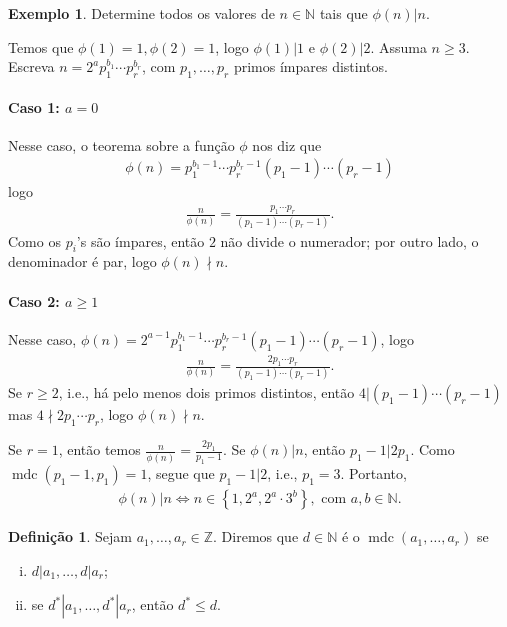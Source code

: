 \documentclass[a4paper,11pt,twoside, leqno]{article}
\DeclareMathOperator{\mdc}{mdc}
\theoremstyle{definition}
\newtheorem*{definition}{Definição}
\newtheorem*{example}{Exemplo}
\begin{document}
\begin{example}
	Determine todos os valores de $n\in\mathbb{N}$ tais que $\phi(n)|n$. 
	\par\vspace{0.3cm} Temos que $\phi(1) = 1, \phi(2) = 1$, logo $\phi(1)|1$ e $\phi(2)|2$. Assuma $n\geq 3$. Escreva $n = 2^ap_1^{b_1}\cdots p_r^{b_r}$, com $p_1, \dots ,p_r$ primos ímpares distintos.
	\paragraph{Caso 1: $a = 0$} Nesse caso, o teorema sobre a função $\phi$ nos diz que 
	\begin{align*}
	\phi(n) = p_1^{b_1 - 1}\cdots p_r^{b_r - 1}(p_1 - 1)\cdots (p_r - 1)
	\end{align*}
	logo
	\begin{align*}
	\frac{n}{\phi(n)} = \frac{p_1\cdots p_r}{(p_1 - 1)\cdots (p_r - 1)}.
	\end{align*}
	Como os $p_i$'s são ímpares, então $2$ não divide o numerador; por outro lado, o denominador é par, logo $\phi(n)\nmid n$.
	\paragraph{Caso 2: $a\geq 1$} Nesse caso, $\phi(n) = 2^{a-1}p_1^{b_1 - 1}\cdots p_r^{b_r - 1}(p_1 - 1)\cdots (p_r - 1)$, logo 
	\begin{align*}
	\frac{n}{\phi(n)} = \frac{2p_1\cdots p_r}{(p_1 - 1)\cdots (p_r - 1)}.
	\end{align*}
	Se $r\geq 2$, i.e., há pelo menos dois primos distintos, então $4|(p_1 - 1)\cdots (p_r - 1)$ mas $4\nmid 2p_1\cdots p_r$, logo $\phi(n)\nmid n$.
	\par\vspace{0.3cm} Se $r=1$, então temos $\displaystyle{\frac{n}{\phi(n)} = \frac{2p_1}{p_1 - 1}}$. Se $\phi(n)|n$, então $p_1 - 1|2p_1$. Como $\mdc(p_1 - 1, p_1) = 1$, segue que $p_1 - 1|2$, i.e., $p_1 = 3$. Portanto, 
	\begin{align*}
	\phi(n)|n \Leftrightarrow n\in\left\{ 1, 2^a, 2^a\cdot 3^b \right\}, \text{ com } a,b\in\mathbb{N}.
	\end{align*}
\end{example}
\begin{definition}
	\label{def mdc geral}
	Sejam $a_1, \dots, a_r\in\mathbb{Z}$. Diremos que $d\in\mathbb{N}$ é o $\mdc(a_1, \dots, a_r)$ se 
	\begin{enumerate}[(i)]
		\item $d|a_1, \dots, d|a_r$;
		\item se $d^\ast|a_1, \dots, d^\ast|a_r$, então $d^\ast\leq d$.
	\end{enumerate}
\end{definition}
\end{document}
